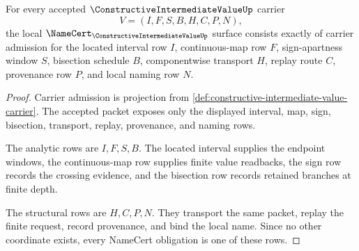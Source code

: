 \begin{theorem}
\label{thm:constructive-intermediate-value-namecert-obligations}
For every accepted $\ConstructiveIntermediateValueUp$ carrier
$$
V=(I,F,S,B,H,C,P,N),
$$
the local $\NameCert_{\ConstructiveIntermediateValueUp}$ surface consists exactly of carrier admission for the located interval row $I$, continuous-map row $F$, sign-apartness window $S$, bisection schedule $B$, componentwise transport $H$, replay route $C$, provenance row $P$, and local naming row $N$.
\end{theorem}
\begin{proof}
Carrier admission is projection from \autoref{def:constructive-intermediate-value-carrier}. The accepted packet exposes only the displayed interval, map, sign, bisection, transport, replay, provenance, and naming rows.

The analytic rows are $I,F,S,B$. The located interval supplies the endpoint windows, the continuous-map row supplies finite value readbacks, the sign row records the crossing evidence, and the bisection row records retained branches at finite depth.

The structural rows are $H,C,P,N$. They transport the same packet, replay the finite request, record provenance, and bind the local name. Since no other coordinate exists, every NameCert obligation is one of these rows.
\end{proof}

